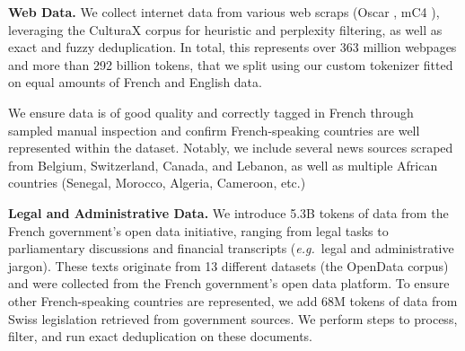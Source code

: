 \textbf{Web Data.} We collect internet data from various web scraps (Oscar , mC4 ), leveraging the CulturaX corpus  for heuristic and perplexity filtering, as well as exact and fuzzy deduplication. In total, this represents over 363 million webpages and more than 292 billion tokens, that we split using our custom tokenizer fitted on equal amounts of French and English data.

We ensure data is of good quality and correctly tagged in French through sampled manual inspection and confirm French-speaking countries are well represented within the dataset. Notably, we include several news sources scraped from Belgium, Switzerland, Canada, and Lebanon, as well as multiple African countries (Senegal, Morocco, Algeria, Cameroon, etc.) 

\textbf{Legal and Administrative Data.}
We introduce 5.3B tokens of data from the French government's open data initiative, ranging from legal tasks to parliamentary discussions and financial transcripts (\emph{e.g.}\ legal and administrative jargon). These texts originate from 13 different datasets (the OpenData corpus) and were collected from the French government's open data platform.
To ensure other French-speaking countries are represented, we add 68M tokens of data from Swiss legislation retrieved from government sources.
We perform steps to process, filter, and run exact deduplication on these documents.

